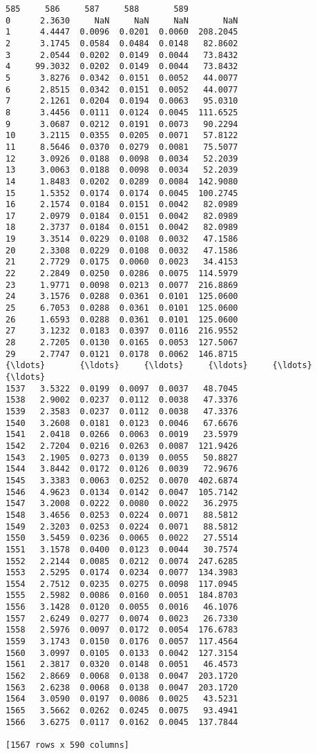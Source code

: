 \documentclass[11pt]{article}
\begin{document}
\begin{Verbatim}[commandchars=\\\{\}]
          585     586     587     588       589  
0      2.3630     NaN     NaN     NaN       NaN  
1      4.4447  0.0096  0.0201  0.0060  208.2045  
2      3.1745  0.0584  0.0484  0.0148   82.8602  
3      2.0544  0.0202  0.0149  0.0044   73.8432  
4     99.3032  0.0202  0.0149  0.0044   73.8432  
5      3.8276  0.0342  0.0151  0.0052   44.0077  
6      2.8515  0.0342  0.0151  0.0052   44.0077  
7      2.1261  0.0204  0.0194  0.0063   95.0310  
8      3.4456  0.0111  0.0124  0.0045  111.6525  
9      3.0687  0.0212  0.0191  0.0073   90.2294  
10     3.2115  0.0355  0.0205  0.0071   57.8122  
11     8.5646  0.0370  0.0279  0.0081   75.5077  
12     3.0926  0.0188  0.0098  0.0034   52.2039  
13     3.0063  0.0188  0.0098  0.0034   52.2039  
14     1.8483  0.0202  0.0289  0.0084  142.9080  
15     1.5352  0.0174  0.0174  0.0045  100.2745  
16     2.1574  0.0184  0.0151  0.0042   82.0989  
17     2.0979  0.0184  0.0151  0.0042   82.0989  
18     2.3737  0.0184  0.0151  0.0042   82.0989  
19     3.3514  0.0229  0.0108  0.0032   47.1586  
20     2.3308  0.0229  0.0108  0.0032   47.1586  
21     2.7729  0.0175  0.0060  0.0023   34.4153  
22     2.2849  0.0250  0.0286  0.0075  114.5979  
23     1.9771  0.0098  0.0213  0.0077  216.8869  
24     3.1576  0.0288  0.0361  0.0101  125.0600  
25     6.7053  0.0288  0.0361  0.0101  125.0600  
26     1.6593  0.0288  0.0361  0.0101  125.0600  
27     3.1232  0.0183  0.0397  0.0116  216.9552  
28     2.7205  0.0130  0.0165  0.0053  127.5067  
29     2.7747  0.0121  0.0178  0.0062  146.8715  
{\ldots}       {\ldots}     {\ldots}     {\ldots}     {\ldots}       {\ldots}  
1537   3.5322  0.0199  0.0097  0.0037   48.7045  
1538   2.9002  0.0237  0.0112  0.0038   47.3376  
1539   2.3583  0.0237  0.0112  0.0038   47.3376  
1540   3.2608  0.0181  0.0123  0.0046   67.6676  
1541   2.0418  0.0266  0.0063  0.0019   23.5979  
1542   2.7204  0.0216  0.0263  0.0087  121.9426  
1543   2.1905  0.0273  0.0139  0.0055   50.8827  
1544   3.8442  0.0172  0.0126  0.0039   72.9676  
1545   3.3383  0.0063  0.0252  0.0070  402.6874  
1546   4.9623  0.0134  0.0142  0.0047  105.7142  
1547   3.2008  0.0222  0.0080  0.0022   36.2975  
1548   3.4656  0.0253  0.0224  0.0071   88.5812  
1549   2.3203  0.0253  0.0224  0.0071   88.5812  
1550   3.5459  0.0236  0.0065  0.0022   27.5514  
1551   3.1578  0.0400  0.0123  0.0044   30.7574  
1552   2.2144  0.0085  0.0212  0.0074  247.6285  
1553   2.5295  0.0174  0.0234  0.0077  134.3983  
1554   2.7512  0.0235  0.0275  0.0098  117.0945  
1555   2.5982  0.0086  0.0160  0.0051  184.8703  
1556   3.1428  0.0120  0.0055  0.0016   46.1076  
1557   2.6249  0.0277  0.0074  0.0023   26.7330  
1558   2.5976  0.0097  0.0172  0.0054  176.6783  
1559   3.1743  0.0150  0.0176  0.0057  117.4564  
1560   3.0997  0.0105  0.0133  0.0042  127.3154  
1561   2.3817  0.0320  0.0148  0.0051   46.4573  
1562   2.8669  0.0068  0.0138  0.0047  203.1720  
1563   2.6238  0.0068  0.0138  0.0047  203.1720  
1564   3.0590  0.0197  0.0086  0.0025   43.5231  
1565   3.5662  0.0262  0.0245  0.0075   93.4941  
1566   3.6275  0.0117  0.0162  0.0045  137.7844  

[1567 rows x 590 columns]

    \end{Verbatim}
\end{document}
